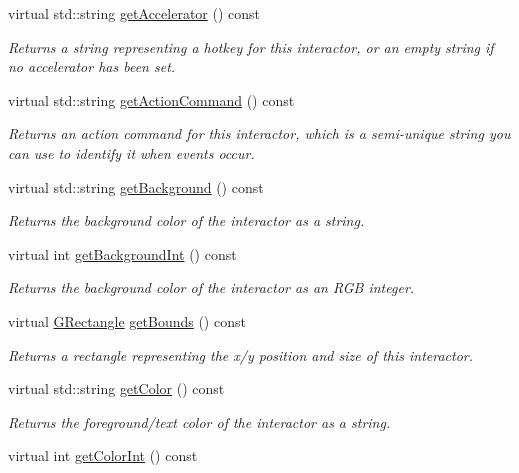 \begin{DoxyCompactItemize}
virtual std\+::string \mbox{\hyperlink{classGInteractor_a69f8d23ed8f207fbecad99960776e942}{get\+Accelerator}} () const
\begin{DoxyCompactList}\small\item\em Returns a string representing a hotkey for this interactor, or an empty string if no accelerator has been set. \end{DoxyCompactList}\item 
virtual std\+::string \mbox{\hyperlink{classGInteractor_a94eb4276000c4fdfb508ce9e6317a82a}{get\+Action\+Command}} () const
\begin{DoxyCompactList}\small\item\em Returns an action command for this interactor, which is a semi-\/unique string you can use to identify it when events occur. \end{DoxyCompactList}\item 
virtual std\+::string \mbox{\hyperlink{classGInteractor_a808e22cc1fdfbecf71ed8c64ef4600e0}{get\+Background}} () const
\begin{DoxyCompactList}\small\item\em Returns the background color of the interactor as a string. \end{DoxyCompactList}\item 
virtual int \mbox{\hyperlink{classGInteractor_a9e827257a55cb8cf4d9de2ec6bcfd7a0}{get\+Background\+Int}} () const
\begin{DoxyCompactList}\small\item\em Returns the background color of the interactor as an R\+GB integer. \end{DoxyCompactList}\item 
virtual \mbox{\hyperlink{classGRectangle}{G\+Rectangle}} \mbox{\hyperlink{classGInteractor_a29e6ac35a0b48f491a4c88194cc5da3b}{get\+Bounds}} () const
\begin{DoxyCompactList}\small\item\em Returns a rectangle representing the x/y position and size of this interactor. \end{DoxyCompactList}\item 
virtual std\+::string \mbox{\hyperlink{classGInteractor_aa061dfa488c31e18549d64363c1d0e34}{get\+Color}} () const
\begin{DoxyCompactList}\small\item\em Returns the foreground/text color of the interactor as a string. \end{DoxyCompactList}\item 
virtual int \mbox{\hyperlink{classGInteractor_a9635c7af766cdc3417f346683fa0e6c1}{get\+Color\+Int}} () const

\end{DoxyCompactItemize}

